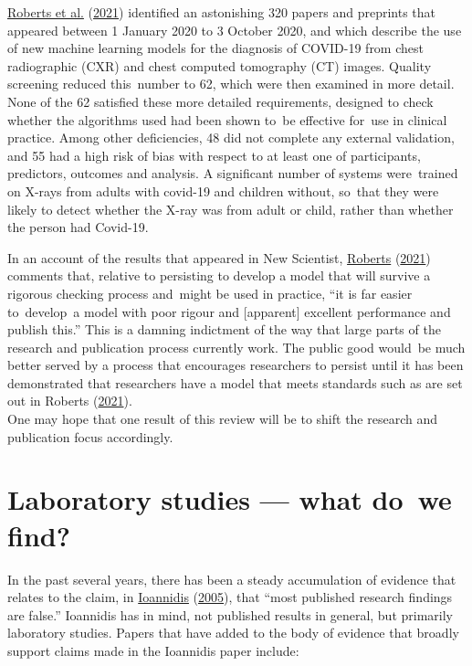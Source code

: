 \documentclass[
  10pt,
  b5paper]{book}
\begin{document}
\protect\hyperlink{ref-roberts2021common}{Roberts et al.} (\protect\hyperlink{ref-roberts2021common}{2021}) identified an astonishing 320 papers and preprints
that appeared between 1 January 2020 to 3 October 2020, and which
describe the use of new machine learning models for the diagnosis of
COVID-19 from chest radiographic (CXR) and chest computed tomography
(CT) images. Quality screening reduced this~number to 62, which were
then examined in more detail. None of the 62 satisfied these more
detailed requirements, designed to check whether the algorithms used
had been shown to~be effective for~use in clinical practice. Among
other deficiencies, 48 did not complete any external validation, and
55 had a high risk of bias with respect to at least one of
participants, predictors, outcomes and analysis. A significant number
of systems were~trained on X-rays from adults with covid-19 and
children without, so~that they were likely to detect whether the
X-ray was from adult or child, rather than whether the person had
Covid-19.

In an account of the results that appeared in New Scientist,
\protect\hyperlink{ref-roberts2021AIcovid19}{Roberts} (\protect\hyperlink{ref-roberts2021AIcovid19}{2021}) comments that, relative to persisting to
develop a model that will survive a rigorous
checking process and~might be used in practice, ``it is far easier
to~develop~a model with poor rigour and {[}apparent{]} excellent
performance and publish this.'' This is a damning indictment of
the way that large parts of the research and publication process
currently work. The public good would~be much better served
by a process that encourages researchers to persist until it
has been demonstrated that researchers have a model that meets
standards such as are set out in Roberts (\protect\hyperlink{ref-roberts2021common}{2021}).\\
One may hope that one result of this review will be to shift
the research and publication focus accordingly.

\hypertarget{sec:lab}{%
\section{Laboratory studies --- what do~we find?}\label{sec:lab}}

In the past several years, there has been a steady accumulation
of evidence that relates to the claim, in \protect\hyperlink{ref-r19_ioannidis_2005}{Ioannidis} (\protect\hyperlink{ref-r19_ioannidis_2005}{2005}),
that ``most published research findings are false.'' Ioannidis
has in mind, not published results in general, but primarily
laboratory studies. Papers that have added to the
body of evidence that broadly support claims made in the
Ioannidis paper include:
\end{document}
